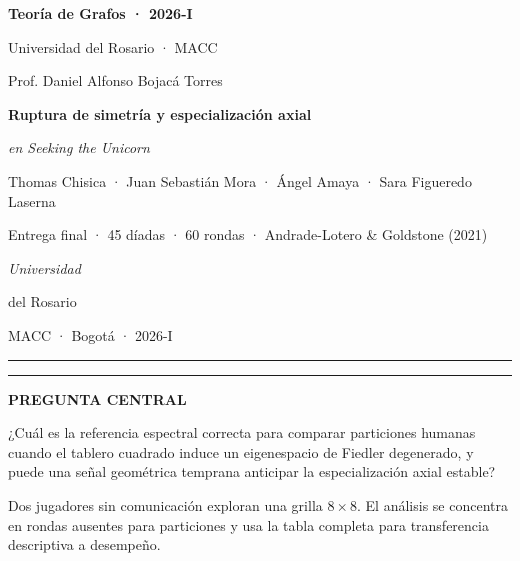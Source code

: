 \documentclass{article}
\newcommand{\eyebrow}[1]{%
  {\color{urBlue}\rule{1.1cm}{2.4pt}}\quad
  {\sffamily\bfseries\fontsize{16}{20}\selectfont\color{urBlue}\MakeUppercase{#1}}\par\vspace{0.16cm}}
\newcommand{\softtext}[1]{%
  {\sffamily\fontsize{15.5}{20.5}\selectfont\color{inkSoft}#1\par}}
\begin{document}
\pagecolor{paper}
\color{ink}


\noindent
\begin{minipage}[t]{0.20\textwidth}
  \vspace{0.55cm}
  {\sffamily\bfseries\fontsize{20}{25}\selectfont Teoría de Grafos · 2026-I\par}
  \softtext{Universidad del Rosario · MACC}
  \softtext{Prof. Daniel Alfonso Bojacá Torres}
\end{minipage}
\hfill
\begin{minipage}[t]{0.58\textwidth}
  \centering
  {\sffamily\bfseries\fontsize{70}{78}\selectfont Ruptura de simetría y especialización axial\par}
  {\rmfamily\itshape\fontsize{58}{65}\selectfont en Seeking the Unicorn\par}
  \vspace{0.75cm}
  {\sffamily\fontsize{28}{34}\selectfont Thomas Chisica · Juan Sebastián Mora · Ángel Amaya · Sara Figueredo Laserna\par}
  \vspace{0.35cm}
  {\sffamily\fontsize{20}{26}\selectfont\color{inkSoft}Entrega final · 45 díadas · 60 rondas · Andrade-Lotero \& Goldstone (2021)\par}
\end{minipage}
\hfill
\begin{minipage}[t]{0.16\textwidth}
  \vspace{0.45cm}
  \raggedleft
  {\rmfamily\itshape\fontsize{34}{40}\selectfont\color{urBurgundy}Universidad\par del Rosario\par}
  \vspace{0.25cm}
  {\sffamily\fontsize{13}{16}\selectfont\color{inkSoft}MACC · Bogotá · 2026-I\par}
\end{minipage}

\vspace{1.0cm}
{\color{rule}\rule{\linewidth}{1.1pt}}
\vspace{0.9cm}

\noindent
\eyebrow{Pregunta central}
{\sffamily\fontsize{38}{47}\selectfont
¿Cuál es la referencia espectral correcta para comparar particiones humanas cuando el tablero cuadrado induce un eigenespacio de Fiedler degenerado, y puede una señal geométrica temprana anticipar la especialización axial estable?\par}
\vspace{0.35cm}
\softtext{Dos jugadores sin comunicación exploran una grilla $8\times8$. El análisis se concentra en rondas ausentes para particiones y usa la tabla completa para transferencia descriptiva a desempeño.}
\end{document}
